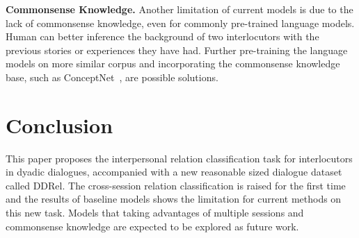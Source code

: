 \documentclass[letterpaper]{article} \usepackage{aaai21}  \usepackage{times}  \usepackage{helvet} \usepackage{courier}  \usepackage[hyphens]{url}  \usepackage{graphicx} \usepackage{xcolor}
\begin{document}
\textbf{Commonsense Knowledge.} Another limitation of current models is due to the lack of commonsense knowledge, even for commonly pre-trained language models. Human can better inference the background of two interlocutors with the previous stories or experiences they have had. Further pre-training the language models on more similar corpus and incorporating the commonsense knowledge base, such as ConceptNet~\cite{SpeerCH17}, are possible solutions.
 


\section{Conclusion}

This paper proposes the interpersonal relation classification task for interlocutors in dyadic dialogues, accompanied with a new reasonable sized dialogue dataset called DDRel. The cross-session relation classification is raised for the first time and the results of baseline models shows the limitation for current methods on this new task. Models that taking advantages of multiple sessions and commonsense knowledge are expected to be explored as future work.
 
 

\end{document}
